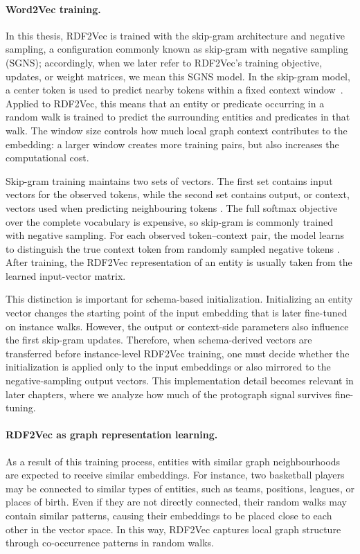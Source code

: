 \documentclass[a4paper,oneside,bibliography=totoc]{scrbook}
\begin{document}
\paragraph{Word2Vec training.}
In this thesis, RDF2Vec is trained with the skip-gram architecture and negative
sampling, a configuration commonly known as skip-gram with negative sampling
(SGNS); accordingly, when we later refer to RDF2Vec's training objective,
updates, or weight matrices, we mean this SGNS model. In the skip-gram model, a
center token is used to predict nearby tokens
within a fixed context window~\citep{mikolov_efficient_2013}. Applied to
RDF2Vec, this means that an entity or predicate occurring in a random walk is
trained to predict the surrounding entities and predicates in that walk. The
window size controls how much local graph context contributes to the embedding:
a larger window creates more training pairs, but also increases the computational
cost.

Skip-gram training maintains two sets of vectors. The first set contains input
vectors for the observed tokens, while the second set contains output, or
context, vectors used when predicting neighbouring tokens
\citep{mikolov_distributed_2013}. The full softmax objective over the complete
vocabulary is expensive, so skip-gram is commonly trained with negative sampling.
For each observed token--context pair, the model learns to distinguish the true
context token from randomly sampled negative tokens
\citep{mikolov_distributed_2013}. After training, the RDF2Vec representation of
an entity is usually taken from the learned input-vector matrix.

This distinction is important for schema-based initialization. Initializing an
entity vector changes the starting point of the input embedding that is later
fine-tuned on instance walks. However, the output or context-side parameters also
influence the first skip-gram updates. Therefore, when schema-derived vectors are
transferred before instance-level RDF2Vec training, one must decide whether the
initialization is applied only to the input embeddings or also mirrored to the
negative-sampling output vectors. This implementation detail becomes relevant in
later chapters, where we analyze how much of the protograph signal survives
fine-tuning.

\paragraph{RDF2Vec as graph representation learning.}
As a result of this training process, entities with similar graph neighbourhoods
are expected to receive similar embeddings. For instance, two basketball players
may be connected to similar types of entities, such as teams, positions, leagues,
or places of birth. Even if they are not directly connected, their random walks
may contain similar patterns, causing their embeddings to be placed close to each
other in the vector space. In this way, RDF2Vec captures local graph structure
through co-occurrence patterns in random walks.
\end{document}
